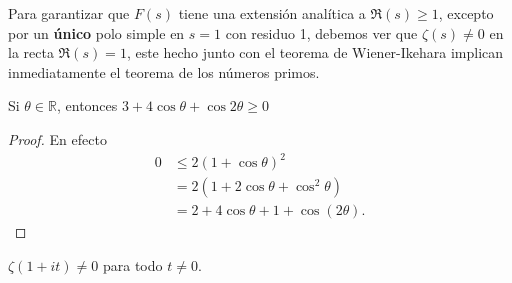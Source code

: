 Para garantizar que $F(s)$ tiene una extensión analítica a $\Re(s)\geq 1$, excepto por un \textbf{único} polo simple en $s=1$ con residuo 1, debemos ver que $\zeta(s)\neq 0$ en la recta $\Re(s)=1$, este hecho junto con el teorema de Wiener-Ikehara implican inmediatamente el teorema de los números primos.

\begin{lemma}
    Si $\theta\in \mathbb{R}$, entonces $3+4\cos\theta+\cos2\theta\geq 0$
\end{lemma}

\begin{proof}
    En efecto
    \begin{align*}
        0&\leq 2(1+\cos\theta)^2\\
        &=2(1+2\cos\theta+\cos^2\theta)\\
        &=2+4\cos\theta+1+\cos(2\theta)
    .\end{align*}
    \end{proof}

\begin{theorem}
$\zeta(1+it)\neq 0$ para todo $t\neq 0$.
\end{theorem}

